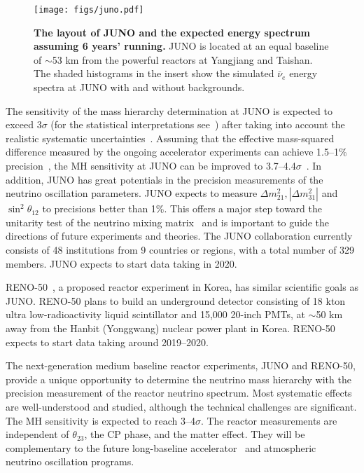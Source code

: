 \begin{figure}[tb] \label{fig:juno}
  \centering
  \texttt{[image: figs/juno.pdf]}
  \caption{{\bf The layout of JUNO and the expected energy spectrum assuming 6 years' running.} JUNO is located at an equal baseline of $\sim$53 km from the powerful reactors at Yangjiang and Taishan. The shaded histograms in the insert show the simulated $\bar\nu_e$ energy spectra at JUNO with and without backgrounds.}
\end{figure}

The sensitivity of the mass hierarchy determination at JUNO is expected to exceed 3$\sigma$ (for the statistical interpretations see~\cite{Qian-Stat,Blennow}) after taking into account the realistic systematic uncertainties~\cite{Li-PRD13,MBRwitepaper}. 
Assuming that the effective mass-squared difference measured by the ongoing accelerator experiments can achieve 1.5--1\% precision~\cite{Agarwalla}, the MH sensitivity at JUNO can be improved to 3.7--4.4$\sigma$~\cite{Li-PRD13}. 
In addition, JUNO has great potentials in the precision measurements of the neutrino oscillation parameters. JUNO expects to measure $\Delta m^2_{21}, |\Delta m^2_{31}|$ and $\sin^2 \theta_{12}$ to precisions better than 1\%. This offers a major step toward the unitarity test of the neutrino mixing matrix~\cite{unitarity13} and is important to guide the directions of future experiments and theories. The JUNO collaboration currently consists of 48 institutions from 9 countries or regions, with a total number of 329 members. JUNO expects to start data taking in 2020.

RENO-50~\cite{RENO-50}, a proposed reactor experiment in Korea, has similar scientific goals as JUNO. RENO-50 plans to build an underground detector consisting of 18 kton ultra low-radioactivity liquid
scintillator and 15,000 20-inch PMTs, at $\sim$50 km away from the Hanbit (Yonggwang) nuclear power plant in Korea. RENO-50 expects to start data taking around 2019--2020.

The next-generation medium baseline reactor experiments, JUNO and RENO-50, provide a unique opportunity to determine the neutrino mass hierarchy with the precision measurement of the reactor neutrino spectrum.
Most systematic effects are well-understood and studied, although the technical challenges are significant. 
The MH sensitivity is expected to reach 3--4$\sigma$.
The reactor measurements are independent of $\theta_{23}$, the CP phase, and the matter effect. 
They will be complementary to the future long-baseline accelerator~\cite{LBNE} and atmospheric~\cite{PINGU} neutrino oscillation programs. 



